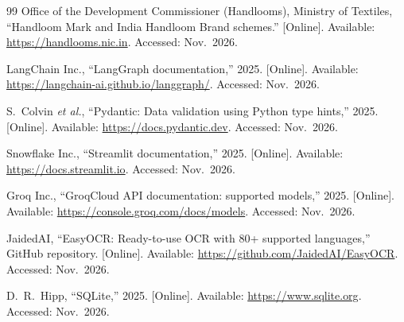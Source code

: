 \begin{thebibliography}{99}
 Office of the Development Commissioner (Handlooms), Ministry of Textiles,
``Handloom Mark and India Handloom Brand schemes.'' [Online]. Available:
\url{https://handlooms.nic.in}. Accessed: Nov.~2026.

 LangChain Inc., ``LangGraph documentation,'' 2025. [Online]. Available:
\url{https://langchain-ai.github.io/langgraph/}. Accessed: Nov.~2026.

 S.~Colvin \emph{et al.}, ``Pydantic: Data validation using Python type hints,''
2025. [Online]. Available: \url{https://docs.pydantic.dev}. Accessed: Nov.~2026.

 Snowflake Inc., ``Streamlit documentation,'' 2025. [Online]. Available:
\url{https://docs.streamlit.io}. Accessed: Nov.~2026.

 Groq Inc., ``GroqCloud API documentation: supported models,'' 2025. [Online].
Available: \url{https://console.groq.com/docs/models}. Accessed: Nov.~2026.

 JaidedAI, ``EasyOCR: Ready-to-use OCR with 80+ supported languages,'' GitHub
repository. [Online]. Available: \url{https://github.com/JaidedAI/EasyOCR}. Accessed: Nov.~2026.

 D.~R.~Hipp, ``SQLite,'' 2025. [Online]. Available: \url{https://www.sqlite.org}.
Accessed: Nov.~2026.

\end{thebibliography}
